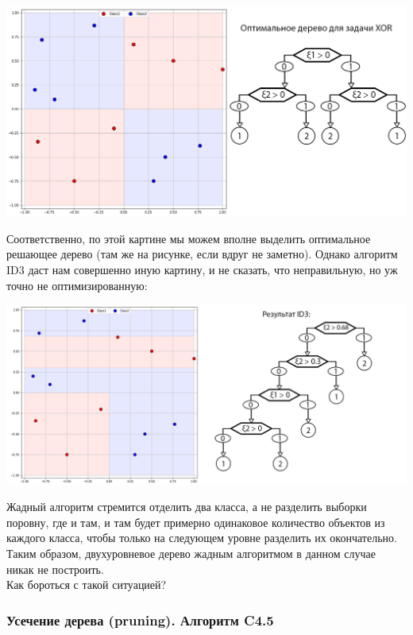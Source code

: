 \documentclass{article}
\begin{document}
\begin{center}
    \includegraphics[scale=0.365]{images/3_5_XOR_optimal.png}
\end{center}

Соответственно, по этой картине мы можем вполне выделить оптимальное решающее дерево (там же на рисунке, если вдруг не заметно). Однако алгоритм ID3 даст нам совершенно иную картину, и не сказать, что неправильную, но уж точно не оптимизированную:

\begin{center}
    \includegraphics[scale=0.345]{images/3_6_XOR_ID3.png}
\end{center}

Жадный алгоритм стремится отделить два класса, а не разделить выборки поровну, где и там, и там будет примерно одинаковое количество объектов из каждого класса, чтобы только на следующем уровне разделить их окончательно. Таким образом, двухуровневое дерево жадным алгоритмом в данном случае никак не построить.
\\

Как бороться с такой ситуацией?

\subsubsection{Усечение дерева (pruning). Алгоритм C4.5}
\end{document}
